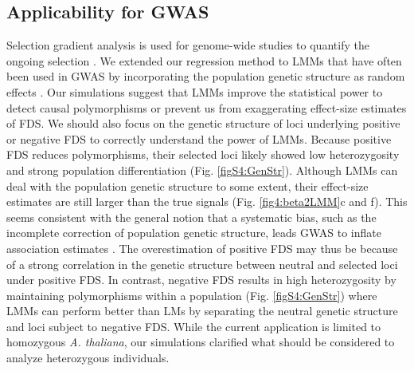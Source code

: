 \documentclass[12pt,]{article}
\begin{document}
\subsection{Applicability for GWAS}
Selection gradient analysis is used for genome-wide studies to quantify the ongoing selection \citep[e.g.,][]{exposito2019natural, groen2020strength}. We extended our regression method to LMMs that have often been used in GWAS by incorporating the population genetic structure as random effects \citep[e.g.,][see also Appendix S3]{kang2008efficient, gondro2013genome}. Our simulations suggest that LMMs improve the statistical power to detect causal polymorphisms or prevent us from exaggerating effect-size estimates of FDS. We should also focus on the genetic structure of loci underlying positive or negative FDS to correctly understand the power of LMMs. Because positive FDS reduces polymorphisms, their selected loci likely showed low heterozygosity and strong population differentiation (Fig. \ref{figS4:GenStr}). Although LMMs can deal with the population genetic structure to some extent, their effect-size estimates are still larger than the true signals (Fig. \ref{fig4:beta2LMM}c and f). This seems consistent with the general notion that a systematic bias, such as the incomplete correction of population genetic structure, leads GWAS to inflate association estimates \citep{gondro2013genome}. The overestimation of positive FDS may thus be because of a strong correlation in the genetic structure between neutral and selected loci under positive FDS. In contrast, negative FDS results in high heterozygosity by maintaining polymorphisms within a population (Fig. \ref{figS4:GenStr}) where LMMs can perform better than LMs by separating the neutral genetic structure and loci subject to negative FDS. While the current application is limited to homozygous \textit{A. thaliana}, our simulations clarified what should be considered to analyze heterozygous individuals.
\end{document}
